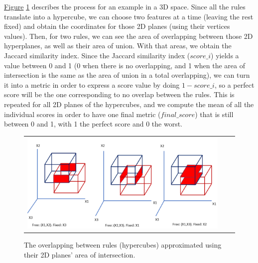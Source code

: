 \hyperref[fig:ch4-img-cubes]{Figure} \ref{fig:ch4-img-cubes} describes the process for an example in a 3D space. Since all the rules translate into a hypercube, we can choose two features at a time (leaving the rest fixed) and obtain the coordinates for those 2D planes (using their vertices values). Then, for two rules, we can see the area of overlapping between those 2D hyperplanes, as well as their area of union. With that areas, we obtain the Jaccard similarity index. Since the Jaccard similarity index ($score\_i$) yields a value between 0 and 1 (0 when there is no overlapping, and 1 when the area of intersection is the same as the area of union in a total overlapping), we can turn it into a metric in order to express a score value by doing $1-score\_i$, so a perfect score will be the one corresponding to no overlap between the rules. This is repeated for all 2D planes of the hypercubes, and we compute the mean of all the individual scores in order to have one final metric ($final\_score$) that is still between 0 and 1, with 1 the perfect score and 0 the worst.

\begin{figure}[h!]
\centering
  \begin{tabular}{c@{\qquad}c@{\qquad}c}
\includegraphics[width=0.8 \columnwidth]{figures/chapter4_RuleExtraction/img_cubes.png}
  \end{tabular} 
  \caption{The overlapping between rules (hypercubes) approximated using their 2D planes' area of intersection.\label{fig:ch4-img-cubes}}
\end{figure}

